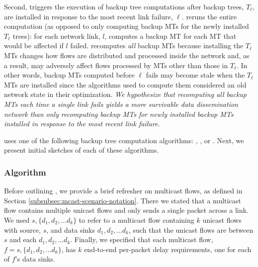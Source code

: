 Second, \mdr triggers the execution of backup tree computations after backup trees, $T_{\ell}$, are installed in response to the most recent link failure, $\ell$. 
\mdr reruns the entire computation (as opposed to only computing backup MTs for the newly installed $T_{\ell}$ trees): 
for each network link, $l$, \mdr computes a backup MT for each MT that would be affected if $l$ failed.  
\mdr recomputes \emph{all} backup MTs because installing the $T_{\ell}$ MTs changes how flows are distributed and processed inside the network and, as a result, may
adversely affect flows processed by MTs other than those in $T_{\ell}$.
In other words, backup MTs computed before $\ell$ fails may become stale when the $T_{\ell}$ MTs are installed since the algorithms used to compute them considered an old network state in their optimization.
\emph{We hypothesize that recomputing \emph{all} backup MTs each time a single link fails yields a more survivable data dissemination network than only recomputing
backup MTs for newly installed backup MTs installed in response to the most recent link failure. }%

\mdr uses one of the following backup tree computation algorithms: \mfs, \mds, or \mcs. Next, we present initial sketches of each of these algorithms. 

\subsubsection{\mf Algorithm}
\label{subsubsec:mf-alg}

Before outlining \mfs, we provide a brief refresher on multicast flows, as defined in Section \ref{subsubsec:mcast-scenario-notation}.
There we stated that a multicast flow contains multiple unicast flows and only sends a single packet across a link.  We used $s,\{d_1,d_2, ... d_k\}$ to refer to a multicast flow containing 
$k$ unicast flows with source, $s$, and data sinks $d_1, d_2, ... d_k$, such that the unicast flows are between $s$ and each $d_1, d_2, ... d_k$.  Finally, we specified that
each multicast flow, $f = s,\{d_1,d_2, ... d_k\}$, has $k$ end-to-end per-packet delay requirements, one for each of $f$'s data sinks.

